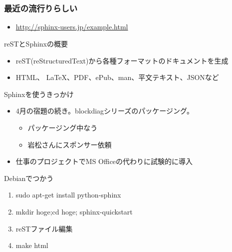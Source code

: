 \frame{\titlepage{}}

\section{}

\begin{frame}
 \frametitle{最近の流行りらしい}
  \begin{itemize}
   \item \url{http://sphinx-users.jp/example.html}
  \end{itemize}
\end{frame}

\begin{frame}{reSTとSphinxの概要}
 \begin{itemize}
  \item reST(reStructuredText)から各種フォーマットのドキュメントを生成
  \item HTML、 \LaTeX 、PDF、ePub、man、平文テキスト、JSONなど
 \end{itemize}
\end{frame}

\begin{frame}{Sphinxを使うきっかけ}
 \begin{itemize}
  \item 4月の宿題の続き。blockdiagシリーズのパッケージング。
	\begin{itemize}
	 \item パッケージング中なう
	 \item 岩松さんにスポンサー依頼
	\end{itemize}
  \item 仕事のプロジェクトでMS Officeの代わりに試験的に導入
 \end{itemize}
\end{frame}

\begin{frame}{Debianでつかう}
 \begin{enumerate}
  \item sudo apt-get install python-sphinx
  \item mkdir hoge;cd hoge; sphinx-quickstart
  \item reSTファイル編集
  \item make html
 \end{enumerate}
\end{frame}


